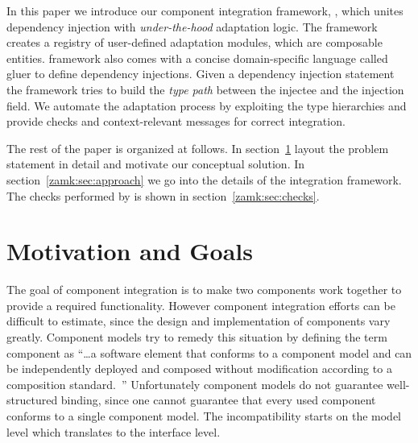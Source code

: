 \documentclass{llncs}
\begin{document}
In this paper we introduce our component integration framework, \zamk, which unites dependency injection with \emph{under-the-hood} adaptation logic. The \zamk framework creates a registry of user-defined adaptation modules, which are composable entities. \zamk framework also comes with a concise domain-specific language called \textsf{gluer} to define dependency injections. Given a dependency injection statement the framework tries to build the \emph{type path} between the injectee and the injection field. We automate the adaptation process by exploiting the type hierarchies and provide checks and context-relevant messages for correct integration. 


The rest of the paper is organized at follows.
In section~\ref{zamk:sec:motivation} layout the problem statement in detail and motivate our conceptual solution. In section~\ref{zamk:sec:approach} we go into the details of the \zamk integration framework. The checks performed by \zamk is shown in section~\ref{zamk:sec:checks}. 



 
\section{Motivation and Goals}
\label{zamk:sec:motivation}
The goal of component integration is to make two components work together to provide a required functionality. However component integration efforts can be difficult to estimate, since the design and implementation of components vary greatly. Component models try to remedy this situation by defining the term component as ``\ldots a software element that conforms to a component model and can be independently deployed and composed without modification according to a composition standard.~\cite{Heineman2001}'' Unfortunately component models do not guarantee well-structured binding, since one cannot guarantee that every used component conforms to a single component model. The incompatibility starts on the model level which translates to the interface level. 
\end{document}
